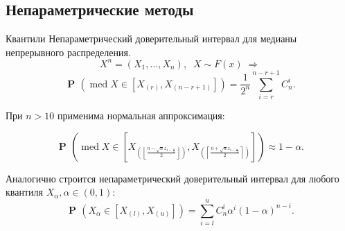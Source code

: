 \documentclass[9pt,pdf,utf8,hyperref={unicode},aspectratio=169]{beamer}
\DeclareMathOperator{\prob}{\mathbf{P}\!}
\DeclareMathOperator{\med}{med}
\begin{document}
\subsection{Непараметрические методы}
\begin{frame}{Квантили}
	Непараметрический доверительный интервал для медианы непрерывного распределения.
	$$X^n = \left(X_1,\dots, X_n\right), \;\; X\sim F\left(x\right)\; \Rightarrow$$
	$$\prob\left(\med X \in \left[X_{(r)}, X_{(n-r+1)}\right]\right) = \frac1{2^n} \sum\limits_{i=r}^{n-r+1} C_n^i.$$
	
	При $n>10$ применима нормальная аппроксимация: 
	
	$$\prob\left(\med X \in \left[X_{\left(\left\lfloor \frac{n - \sqrt{n} z_{1-\frac{\alpha}{2}}}{2} \right\rfloor\right)}, X_{\left(\left\lceil  \frac{n + \sqrt{n} z_{1-\frac{\alpha}{2}}}{2} \right\rceil \right)}\right]\right) \approx 1-\alpha.$$
	
	\bigskip
	
	Аналогично строится непараметрический доверительный интервал для любого квантиля $X_\alpha, \alpha\in\left(0,1\right)$:
	$$\prob\left(X_\alpha \in \left[X_{(l)}, X_{(u)}\right]\right) = \sum\limits_{i=l}^u C_n^i \alpha^i \left(1-\alpha\right)^{n-i}.$$
\end{frame}
\end{document}
